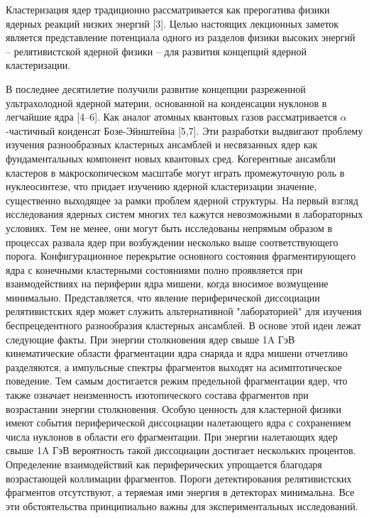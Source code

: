 \documentclass[fontsize=14pt]{scrarticle}
\begin{document}
Кластеризация ядер традиционно рассматривается как прерогатива физики ядерных реакций низких энергий [3]. Целью настоящих лекционных заметок является представление потенциала одного из разделов физики высоких энергий – релятивистской ядерной физики – для развития концепций ядерной кластеризации. 

В последнее десятилетие получили развитие концепции разреженной ультрахолодной ядерной материи, основанной на конденсации нуклонов в легчайшие ядра [4–6]. Как аналог атомных квантовых газов рассматривается $\alpha$-частичный конденсат Бозе-Эйнштейна [5,7]. Эти разработки выдвигают проблему изучения разнообразных кластерных ансамблей и несвязанных ядер как фундаментальных компонент новых квантовых сред. Когерентные ансамбли кластеров в макроскопическом масштабе могут играть промежуточную роль в нуклеосинтезе, что придает изучению ядерной кластеризации значение, существенно выходящее за рамки проблем ядерной структуры. На первый взгляд исследования ядерных систем многих тел кажутся невозможными в лабораторных условиях. Тем не менее, они могут быть исследованы непрямым образом в процессах развала ядер при возбуждении несколько выше соответствующего порога. Конфигурационное перекрытие основного состояния фрагментирующего ядра с конечными кластерными состояниями полно проявляется при взаимодействиях на периферии ядра мишени, когда вносимое возмущение минимально. Представляется, что явление периферической диссоциации релятивистских ядер может служить альтернативной "лабораторией" для изучения беспрецедентного разнообразия кластерных ансамблей. В основе этой идеи лежат следующие факты. При энергии столкновения ядер свыше 1A ГэВ кинематические области фрагментации ядра снаряда и ядра мишени отчетливо разделяются, а импульсные спектры фрагментов выходят на асимптотическое поведение. Тем самым достигается режим предельной фрагментации ядер, что также означает неизменность изотопического состава фрагментов при возрастании энергии столкновения. Особую ценность для кластерной физики имеют события периферической диссоциации налетающего ядра с сохранением числа нуклонов в области его фрагментации. При энергии налетающих ядер свыше 1A ГэВ вероятность такой диссоциации достигает нескольких процентов. Определение взаимодействий как периферических упрощается благодаря возрастающей коллимации фрагментов. Пороги детектирования релятивистских фрагментов отсутствуют, а теряемая ими энергия в детекторах минимальна. Все эти обстоятельства принципиально важны для экспериментальных исследований.
\end{document}
